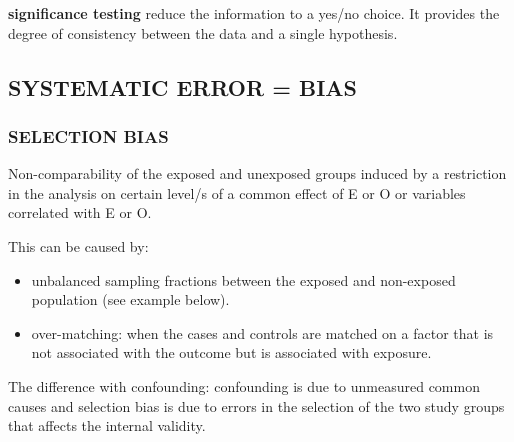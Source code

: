 \documentclass[
]{article}
\begin{document}
\textbf{significance testing} reduce the information to a yes/no choice.
It provides the degree of consistency between the data and a single
hypothesis.

\hypertarget{systematic-error-bias}{%
\subsection{SYSTEMATIC ERROR = BIAS}\label{systematic-error-bias}}

\hypertarget{selection-bias}{%
\subsubsection{SELECTION BIAS}\label{selection-bias}}

Non-comparability of the exposed and unexposed groups induced by a
restriction in the analysis on certain level/s of a common effect of E
or O or variables correlated with E or O.

This can be caused by:

\begin{itemize}
\item
  unbalanced sampling fractions between the exposed and non-exposed
  population (see example below).
\item
  over-matching: when the cases and controls are matched on a factor
  that is not associated with the outcome but is associated with
  exposure.
\end{itemize}

The difference with confounding: confounding is due to unmeasured common
causes and selection bias is due to errors in the selection of the two
study groups that affects the internal validity.
\end{document}

